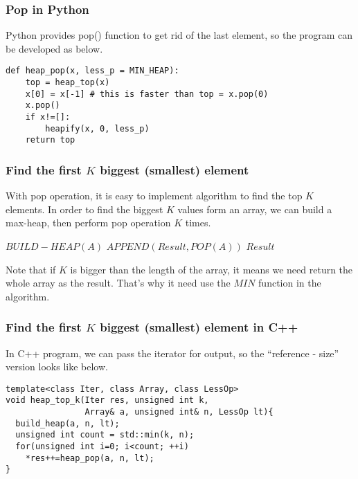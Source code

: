 \documentclass{article}
\begin{document}
\subsubsection*{Pop in Python}

Python provides pop() function to get rid of the last element,
so the program can be developed as below.

\begin{lstlisting}
def heap_pop(x, less_p = MIN_HEAP):
    top = heap_top(x)
    x[0] = x[-1] # this is faster than top = x.pop(0)
    x.pop()
    if x!=[]:
        heapify(x, 0, less_p)
    return top
\end{lstlisting}

\subsubsection{Find the first $K$ biggest (smallest) element}

With pop operation, it is easy to implement algorithm to
find the top $K$ elements. In order to find the biggest $K$
values form an array, we can build a max-heap, then perform
pop operation $K$ times.

\begin{algorithmic}[1]
  \State $BUILD-HEAP(A)$
    \State $APPEND(Result, POP(A))$
  \EndFor
  \State \Return $Result$
\EndFunction
\end{algorithmic}

Note that if $K$ is bigger than the length of the array, it means
we need return the whole array as the result. That's why it need
use the $MIN$ function in the algorithm.

\subsubsection*{Find the first $K$ biggest (smallest) element in C++}

In C++ program, we can pass the iterator for output, so the 
``reference - size'' version looks like below.

\lstset{language=C++}
\begin{lstlisting}
template<class Iter, class Array, class LessOp>
void heap_top_k(Iter res, unsigned int k, 
                Array& a, unsigned int& n, LessOp lt){
  build_heap(a, n, lt);
  unsigned int count = std::min(k, n);
  for(unsigned int i=0; i<count; ++i)
    *res++=heap_pop(a, n, lt);
}
\end{lstlisting}
\end{document}
